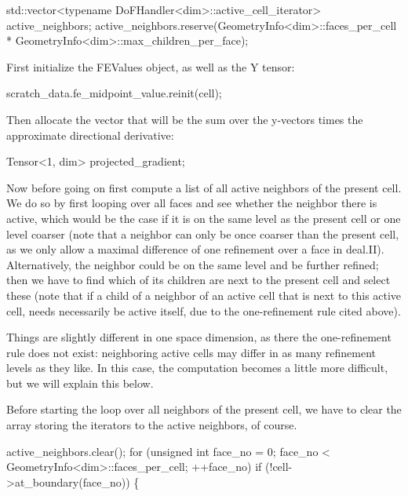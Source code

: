 \begin{DoxyCode}
std::vector<typename DoFHandler<dim>::active\_cell\_iterator>
    active\_neighbors;
active\_neighbors.reserve(GeometryInfo<dim>::faces\_per\_cell *
                         GeometryInfo<dim>::max\_children\_per\_face);
\end{DoxyCode}


First initialize the {\ttfamily F\+E\+Values} object, as well as the {\ttfamily Y} tensor\+:


\begin{DoxyCode}
scratch\_data.fe\_midpoint\_value.reinit(cell);
\end{DoxyCode}


Then allocate the vector that will be the sum over the y-\/vectors times the approximate directional derivative\+:


\begin{DoxyCode}
Tensor<1, dim> projected\_gradient;
\end{DoxyCode}


Now before going on first compute a list of all active neighbors of the present cell. We do so by first looping over all faces and see whether the neighbor there is active, which would be the case if it is on the same level as the present cell or one level coarser (note that a neighbor can only be once coarser than the present cell, as we only allow a maximal difference of one refinement over a face in deal.\+II). Alternatively, the neighbor could be on the same level and be further refined; then we have to find which of its children are next to the present cell and select these (note that if a child of a neighbor of an active cell that is next to this active cell, needs necessarily be active itself, due to the one-\/refinement rule cited above).

Things are slightly different in one space dimension, as there the one-\/refinement rule does not exist\+: neighboring active cells may differ in as many refinement levels as they like. In this case, the computation becomes a little more difficult, but we will explain this below.

Before starting the loop over all neighbors of the present cell, we have to clear the array storing the iterators to the active neighbors, of course.


\begin{DoxyCode}
active\_neighbors.clear();
\textcolor{keywordflow}{for} (\textcolor{keywordtype}{unsigned} \textcolor{keywordtype}{int} face\_no = 0; face\_no < GeometryInfo<dim>::faces\_per\_cell;
     ++face\_no)
    \textcolor{keywordflow}{if} (!cell->at\_boundary(face\_no)) \{
\end{DoxyCode}


